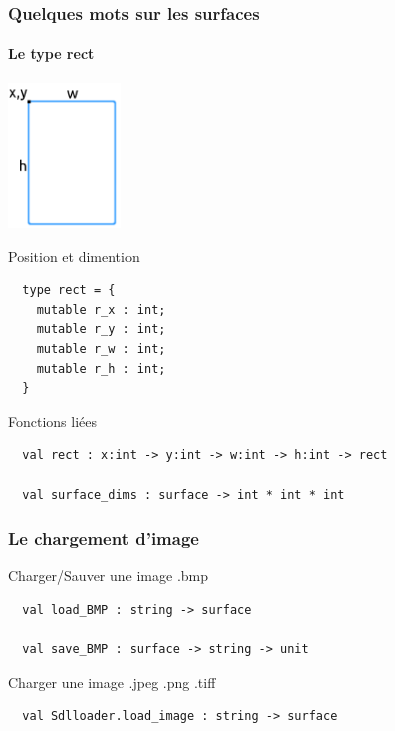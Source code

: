 \begin{frame}[fragile]
	\frametitle{Quelques mots sur les surfaces}
	\framesubtitle{Le type rect}
	\begin{center}\begin{minipage}{0.4\textwidth}
		\includegraphics[width=3cm]{pics/rect.png}
	\end{minipage}
	\begin{minipage}{0.4\textwidth}
		\begin{block}{Position et dimention}
			\lstset{basicstyle=\footnotesize}
			\begin{lstlisting}
  type rect = {
    mutable r_x : int;
    mutable r_y : int;
    mutable r_w : int;
    mutable r_h : int;
  } 
			\end{lstlisting}
		\end{block}
	\end{minipage}\end{center}
	\begin{block}{Fonctions liées}
		\lstset{basicstyle=\footnotesize}
		\begin{lstlisting}
  val rect : x:int -> y:int -> w:int -> h:int -> rect

  val surface_dims : surface -> int * int * int
		\end{lstlisting}
	\end{block}
\end{frame}

\begin{frame}[fragile]
	\frametitle{Le chargement d'image}
	\begin{block}{Charger/Sauver une image .bmp}
		\begin{lstlisting}
  val load_BMP : string -> surface

  val save_BMP : surface -> string -> unit
		\end{lstlisting}
	\end{block}
	\begin{block}{Charger une image .jpeg .png .tiff}
		\begin{lstlisting}
  val Sdlloader.load_image : string -> surface

		\end{lstlisting}
	\end{block}
\end{frame}

